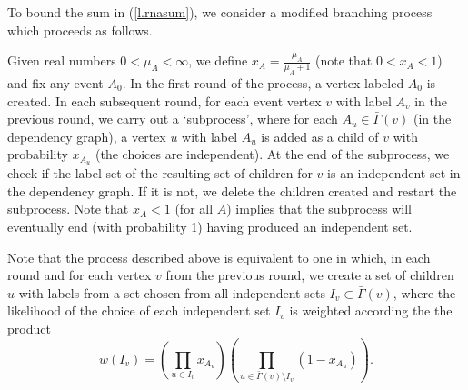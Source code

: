 \documentclass[letterpaper]{article}
\newcommand{\sbs}{\subset}
\theoremstyle{definition}
\theoremstyle{remark}
\newcommand{\stm}{\setminus}
\begin{document}
To bound the sum in (\ref{l.rnasum}), we consider a modified branching process which proceeds as follows.

Given real numbers $0<\mu_A<\infty$, we define $x_A=\frac{\mu_A}{\mu_A+1}$ (note that $0<x_A<1$) and fix any event $A_0$.  In the first round of the process, a vertex labeled $A_0$ is created.  In each subsequent round, for each event vertex $v$ with label $A_v$ in the previous round, we carry out a `subprocess', where for each $A_u\in \bar\Gamma(v)$ (in the dependency graph), a vertex $u$ with label $A_u$ is added as a child of $v$ with probability $x_{A_u}$ (the choices are independent).  At the end of the subprocess, we check if the label-set of the resulting set of children for $v$ is an independent set in the dependency graph.  If it is not, we delete the children created and restart the subprocess.  Note that $x_A<1$ (for all $A$) implies that the subprocess will eventually end (with probability 1) having produced an independent set.

Note that the process described above is equivalent to one in which, in each round and for each vertex $v$ from the previous round, we create a set of children $u$ with labels from a set chosen from all independent sets $I_v\sbs \bar\Gamma(v)$, where the likelihood of the choice of each independent set $I_v$ is weighted according the the product 
\[
w(I_v)=\left(\prod_{u\in I_v}x_{A_u}\right)\left(\prod_{u\in \bar\Gamma(v)\stm I_v}(1-x_{A_u})\right).
\]
\end{document}
